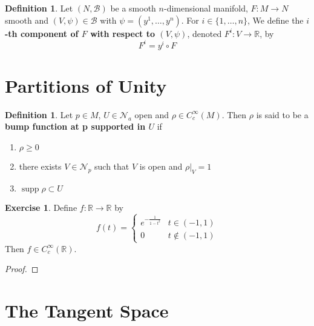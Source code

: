 \documentclass{book}
\theoremstyle{definition}
\newtheorem{defn}[definition]{Definition}
\newtheorem{ex}[definition]{Exercise}
\newcommand{\R}{\mathbb{R}}
\newcommand{\MB}{\mathcal{B}}
\newcommand{\MN}{\mathcal{N}}
\DeclareMathOperator{\supp}{supp}
\DeclareMathOperator*{\0}{\mbf{0}}
\DeclareMathOperator*{\1}{\mbf{1}}
\begin{document}
	\begin{defn}
		Let $(N, \MB)$ be a smooth  $n$-dimensional manifold, $F: M \rightarrow N$ smooth and $(V, \psi) \in \MB$ with $\psi = (y^1, \dots, y^n)$. For $i \in \{1, \dots, n\}$, We define the \textbf{$i$-th component of $F$ with respect to $(V, \psi)$},  denoted $F^i: V \rightarrow \R$, by $$F^i = y^i \circ F$$  
	\end{defn}

	











\newpage 
\section{Partitions of Unity}
	
	\begin{defn}
	Let $p \in M$, $U \in \MN_a$ open and $\rho \in C_c^{\infty}(M)$. Then $\rho$ is said to be a \textbf{bump function at p supported in $U$} if 
	\begin{enumerate}
	\item $\rho \geq 0$ 
	\item there exists $V \in \MN_p$ such that $V$ is open and $\rho|_V = 1$ 
	\item $\supp \rho \subset U$
	\end{enumerate}
	\end{defn}
	
	\begin{ex}
	Define $f:\R \rightarrow \R$ by 
	\[
	f(t) = 
	\begin{cases}
	e^{-\frac{1}{1-t^2}} & t \in (-1,1)\\
	0 &  t \not \in (-1,1)
	\end{cases}
	\]
	Then $f \in C_c^{\infty}(\R)$.
	\end{ex}
	
	\begin{proof}
	
	\end{proof}
	
	
















	\newpage
	\section{The Tangent Space}
\end{document}
